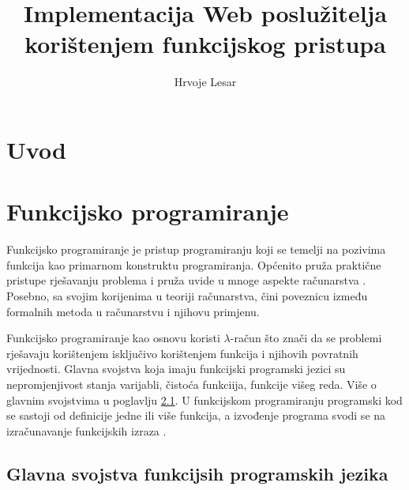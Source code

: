 \documentclass[]{foi} %
\title{Implementacija Web poslužitelja korištenjem funkcijskog pristupa}
\author{Hrvoje Lesar} %
\begin{document}
\maketitle

\tableofcontents

\makeatletter {} \makeatother
\pagestyle{plain}

\chapter{Uvod}

\chapter{Funkcijsko programiranje}

Funkcijsko programiranje je pristup programiranju koji se temelji na pozivima funkcija kao primarnom konstruktu programiranja.
Općenito pruža praktične pristupe rješavanju problema i pruža uvide u mnoge aspekte računarstva \cite{michaelson2011introduction}.
Posebno, sa svojim korijenima u teoriji računarstva, čini poveznicu između formalnih metoda u računarstvu i njihovu primjenu.

Funkcijsko programiranje kao osnovu koristi $\lambda$-račun što znači da se problemi rješavaju korištenjem
isključivo korištenjem funkcija i njihovih povratnih vrijednosti. Glavna svojstva koja imaju funkcijski
programski jezici su nepromjenjivost stanja varijabli, čistoća funkciija, funkcije višeg reda. Više o glavnim svojstvima
u poglavlju \ref{sec:svojstva}. U funkcijskom programiranju programski kod se sastoji od definicije jedne
ili više funkcija, a izvođenje programa svodi se na izračunavanje funkcijskih izraza \cite{rovzic2016lambda}.

\section{Glavna svojstva funkcijsih programskih jezika} \label{sec:svojstva}
\end{document}
